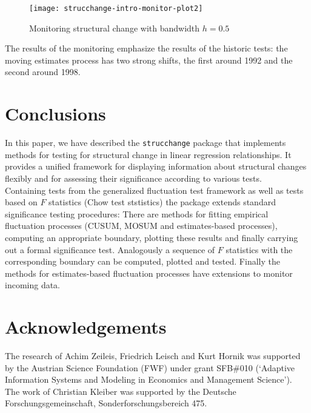 \documentclass[10pt,a4paper]{article}
\begin{document}
\begin{figure}[htbp]
\begin{center}
\texttt{[image: strucchange-intro-monitor-plot2]}
\caption{\label{fig:monitor2} Monitoring structural change with
bandwidth $h=0.5$} \end{center}
\end{figure}

The results of the monitoring emphasize the results of the historic tests: the
moving estimates process has two strong shifts, the first around 1992 and the
second around 1998.

\section{Conclusions} \label{sec:conclusions}

In this paper, we have described the {\tt strucchange} package that implements
methods for testing for structural change in linear regression relationships.
It provides a unified framework for displaying information
about structural changes flexibly and for assessing their significance
according to various tests.\\

Containing tests from the generalized fluctuation test framework as well as
tests based on $F$ statistics (Chow test ststistics) the package extends
standard significance testing procedures: There are methods for fitting
empirical fluctuation processes (CUSUM, MOSUM and estimates-based
processes), computing an appropriate boundary, plotting these results and
finally carrying out a formal significance test. Analogously a sequence of $F$
statistics with the corresponding boundary can be computed, plotted and tested.
Finally the methods for estimates-based fluctuation processes have extensions to
monitor incoming data.


\section*{Acknowledgements}

The research of Achim Zeileis, Friedrich Leisch and Kurt Hornik was supported
by the Austrian Science Foundation (FWF) under grant SFB\#010 (`Adaptive
Information Systems and Modeling in Economics and Management Science').\\
The work of Christian Kleiber was supported by the
Deutsche Forschungsgemeinschaft, Sonderforschungsbereich 475.

\newpage
\end{document}
